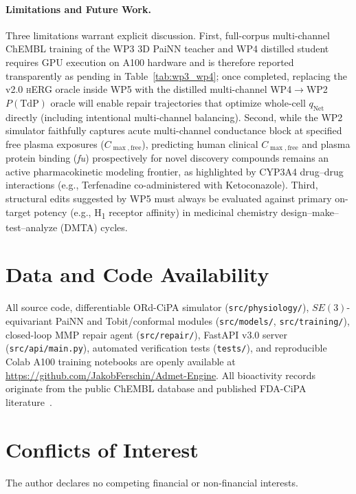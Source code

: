 \documentclass[10pt,twocolumn,letterpaper]{article}
\newcommand{\qnet}{q_{\mathrm{Net}}}
\newcommand{\cmax}{C_{\max,\mathrm{free}}}
\begin{document}
\paragraph{Limitations and Future Work.}
Three limitations warrant explicit discussion. First, full-corpus multi-channel ChEMBL training of the WP3 3D PaiNN teacher and WP4 distilled student requires GPU execution on A100 hardware and is therefore reported transparently as pending in Table~\ref{tab:wp3_wp4}; once completed, replacing the v2.0 \textsc{hERG} oracle inside WP5 with the distilled multi-channel WP4$\to$WP2 $P(\mathrm{TdP})$ oracle will enable repair trajectories that optimize whole-cell $\qnet$ directly (including intentional multi-channel balancing). Second, while the WP2 simulator faithfully captures acute multi-channel conductance block at specified free plasma exposures ($\cmax$), predicting human clinical $\cmax$ and plasma protein binding (\textit{fu}) prospectively for novel discovery compounds remains an active pharmacokinetic modeling frontier, as highlighted by CYP3A4 drug--drug interactions (e.g., Terfenadine co-administered with Ketoconazole). Third, structural edits suggested by WP5 must always be evaluated against primary on-target potency (e.g., H\textsubscript{1} receptor affinity) in medicinal chemistry design--make--test--analyze (DMTA) cycles.

\section*{Data and Code Availability}
All source code, differentiable ORd-CiPA simulator (\texttt{src/physiology/}), $SE(3)$-equivariant PaiNN and Tobit/conformal modules (\texttt{src/models/}, \texttt{src/training/}), closed-loop MMP repair agent (\texttt{src/repair/}), FastAPI v3.0 server (\texttt{src/api/main.py}), automated verification tests (\texttt{tests/}), and reproducible Colab A100 training notebooks are openly available at \href{https://github.com/JakobFerschin/Admet-Engine}{https://github.com/JakobFerschin/Admet-Engine}. All bioactivity records originate from the public ChEMBL database and published FDA-CiPA literature~\cite{colatsky2016comprehensive,crumb2016evaluation,li2019assessment}.

\section*{Conflicts of Interest}
The author declares no competing financial or non-financial interests.
\end{document}
